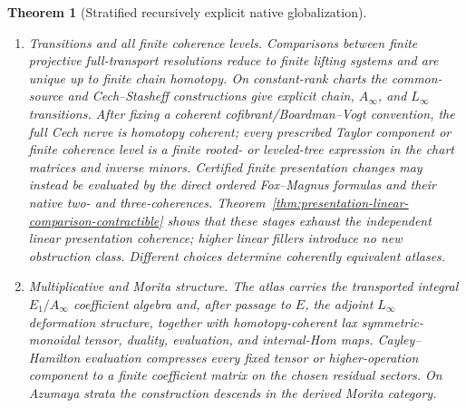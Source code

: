 \documentclass[11pt]{article}
\newtheorem{theorem}{Theorem}[section]
\theoremstyle{definition}
\begin{document}
\begin{theorem}[Stratified recursively explicit native globalization]
\begin{enumerate}[label=\textnormal{(\roman*)}]
\item \emph{Transitions and all finite coherence levels.}  Comparisons between finite projective full-transport resolutions reduce to finite lifting systems and are unique up to finite chain homotopy.  On constant-rank charts the common-source and Cech--Stasheff constructions give explicit chain, $A_\infty$, and $L_\infty$ transitions.  After fixing a coherent cofibrant/Boardman--Vogt convention, the full Cech nerve is homotopy coherent; every prescribed Taylor component or finite coherence level is a finite rooted- or leveled-tree expression in the chart matrices and inverse minors.  Certified finite presentation changes may instead be evaluated by the direct ordered Fox--Magnus formulas and their native two- and three-coherences.  Theorem~\ref{thm:presentation-linear-comparison-contractible} shows that these stages exhaust the independent linear presentation coherence; higher linear fillers introduce no new obstruction class.  Different choices determine coherently equivalent atlases.

\item \emph{Multiplicative and Morita structure.}  The atlas carries the transported integral $E_1/A_\infty$ coefficient algebra and, after passage to $E$, the adjoint $L_\infty$ deformation structure, together with homotopy-coherent lax symmetric-monoidal tensor, duality, evaluation, and internal-Hom maps.  Cayley--Hamilton evaluation compresses every fixed tensor or higher-operation component to a finite coefficient matrix on the chosen residual sectors.  On Azumaya strata the construction descends in the derived Morita category.


\end{enumerate}
\end{theorem}
\end{document}
